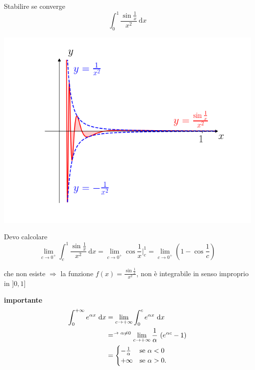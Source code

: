 \begin{exbar}
\begin{example}
	Stabilire se converge 
	\begin{equation*}
		\label{eq:pag 83}
		\int_{0}^{1} \frac{\sin{\frac{1}{x}}}{x^2} \ \mathrm{d}x
	\end{equation*}
	
	\begin{center}
		\includegraphics[width=0.75\linewidth]{integrali_impropri/pag83}
		\label{fig:pag83}
	\end{center}
	
		Devo calcolare 
	\begin{equation*}
		\lim_{c\rightarrow0^+} \int_{c}^{1} \frac{\sin{\frac{1}{x}}}{x^2} \ \mathrm{d}x= \lim_{c \rightarrow 0^+} \cos{\frac{1}{x}} \bigg|_{c}^{1}=\lim_{c\rightarrow 0^+}\left(1-\cos{\frac{1}{c}}\right)
	\end{equation*}
	
	che non esiste $\Rightarrow$ la funzione $f(x)=\frac{\sin{\frac{1}{x}}}{x^2}$, non è integrabile in senso improprio in $]0,1]$	
\end{example}
\end{exbar}

\begin{exbar}
\begin{example} \textbf{importante}
	\begin{align*}
		\int_{0}^{+\infty} e^{\alpha x} \ \mathrm{d}x 
		&= \lim_{c \rightarrow +\infty} \int_{0}^{c} e^{\alpha x} \ \mathrm{d}x 
		\\ & =^{\myarrow[10] \alpha \neq 0} \lim_{c \rightarrow +\infty} \frac{1}{\alpha} \ (e^{\alpha c}-1)
		\\
		&= \begin{cases}
			-\frac{1}{\alpha} & \text{se } \alpha <0
			\\
			+\infty & \text{se } \alpha >0.
		\end{cases}
	\end{align*}
\end{example}
\end{exbar}

